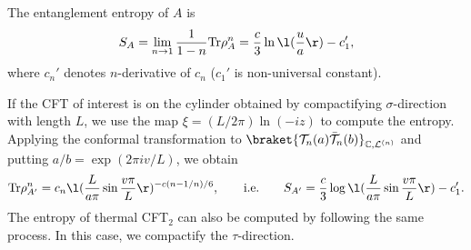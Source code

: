 \documentclass[12pt]{article}
\begin{document}
The entanglement entropy of $A$ is 
\begin{align}
	S_A = \lim_{n\to 1}\frac{1}{1-n}\mathrm{Tr}\rho_A^n = \frac{c}{3}\ln\l(\frac{u}{a}\r) - c_1',
\end{align}
where $c_n'$ denotes $n$-derivative of $c_n$ ($c_1'$ is non-universal constant).

If the CFT of interest is on the cylinder obtained by compactifying $\sigma$-direction with length $L$, we use the map $\xi = (L/2\pi)\ln (-iz)$ to compute the entropy.
Applying the conformal transformation to $\braket{\mathcal T_n(a)\bar{\mathcal T}_n(b)}_{\mathbb C,\mathcal L^{(n)}}$ and putting $a/b = \exp(2\pi i v/L)$, we obtain
\begin{align}
	\mathrm{Tr}\rho_{A'}^n = c_n\l(\frac{L}{a\pi }\sin\frac{v\pi}{L}\r)^{-c(n-1/n)/6},\qquad
	\mathrm{i.e.}\qquad
	S_{A'} = \frac{c}{3}\log\l(\frac{L}{a \pi}\sin\frac{v\pi}{L}\r) - c_1'.
\end{align}
The entropy of thermal CFT$_2$ can also be computed by following the same process.
In this case, we compactify the $\tau$-direction.






 

\end{document}
